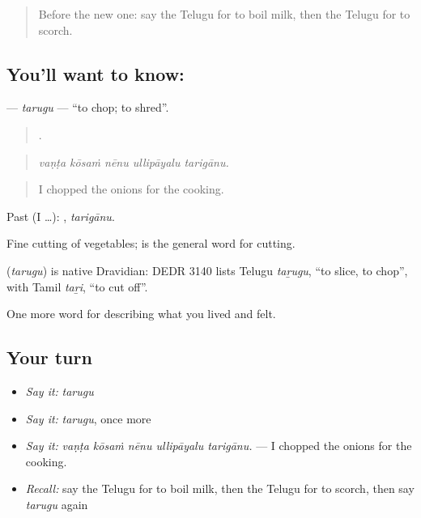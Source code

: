 \label{lesson:TE-C548-tarugu}



\begin{quote}
Before the new one: say the Telugu for to boil milk, then the Telugu for to scorch.
\end{quote}

\subsection*{You'll want to know: }
\textbf{} — \emph{tarugu} — \textquotedblleft{}to chop; to shred\textquotedblright{}.

\begin{quote}
    .
\end{quote}

\begin{quote}
\emph{vaṇṭa kōsaṁ nēnu ullipāyalu tarigānu.}
\end{quote}

\begin{quote}
I chopped the onions for the cooking.
\end{quote}

Past (I …): , \emph{tarigānu}.

Fine cutting of vegetables;  is the general word for cutting.

\begin{cousinweb}
\textbf{} (\emph{tarugu}) is native Dravidian: DEDR 3140 lists Telugu \emph{taṟugu}, \textquotedblleft{}to slice, to chop\textquotedblright{}, with Tamil \emph{taṟi}, \textquotedblleft{}to cut off\textquotedblright{}.
\end{cousinweb}

\begin{grammarlens}[title={What you've built}]
One more word for describing what you lived and felt.
\end{grammarlens}

\subsection*{Your turn}
\begin{itemize}
\raggedright
  \item \emph{Say it:} \emph{tarugu}
  \item \emph{Say it:} \emph{tarugu}, once more
  \item \emph{Say it:} \emph{vaṇṭa kōsaṁ nēnu ullipāyalu tarigānu.} — I chopped the onions for the cooking.
  \item \emph{Recall:} say the Telugu for to boil milk, then the Telugu for to scorch, then say \emph{tarugu} again
\end{itemize}

